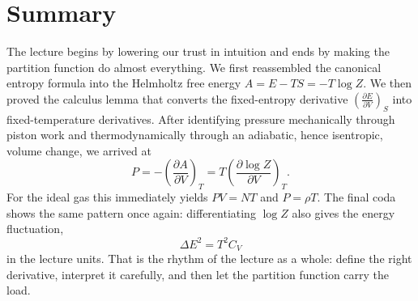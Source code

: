 \section{Summary}

The lecture begins by lowering our trust in intuition and ends by making the partition function do almost everything. We first reassembled the canonical entropy formula into the Helmholtz free energy \(A=E-TS=-T\log Z\). We then proved the calculus lemma that converts the fixed-entropy derivative \(\left(\frac{\partial E}{\partial V}\right)_S\) into fixed-temperature derivatives. After identifying pressure mechanically through piston work and thermodynamically through an adiabatic, hence isentropic, volume change, we arrived at
\begin{equation}
P = -\left(\frac{\partial A}{\partial V}\right)_T
=
T\left(\frac{\partial \log Z}{\partial V}\right)_T.
\end{equation}
For the ideal gas this immediately yields \(PV=NT\) and \(P=\rho T\). The final coda shows the same pattern once again: differentiating \(\log Z\) also gives the energy fluctuation,
\begin{equation}
\Delta E^2 = T^2 C_V
\end{equation}
in the lecture units. That is the rhythm of the lecture as a whole: define the right derivative, interpret it carefully, and then let the partition function carry the load.
